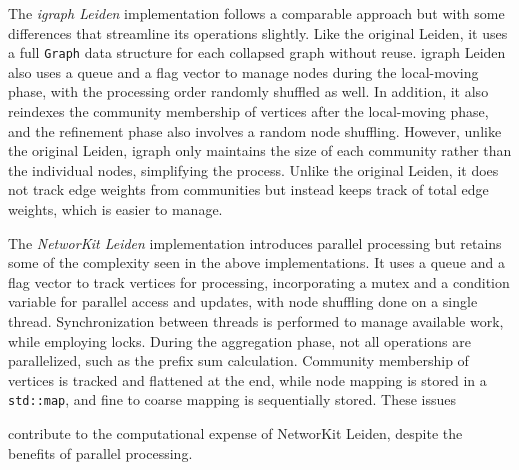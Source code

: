 The \textit{igraph Leiden} implementation \cite{csardi2006igraph} follows a comparable approach but with some differences that streamline its operations slightly. Like the original Leiden, it uses a full \texttt{Graph} data structure for each collapsed graph without reuse. igraph Leiden also uses a queue and a flag vector to manage nodes during the local-moving phase, with the processing order randomly shuffled as well. In addition, it also reindexes the community membership of vertices after the local-moving phase, and the refinement phase also involves a random node shuffling. However, unlike the original Leiden, igraph only maintains the size of each community rather than the individual nodes, simplifying the process. Unlike the original Leiden, it does not track edge weights from communities but instead keeps track of total edge weights, which is easier to manage.

The \textit{NetworKit Leiden} implementation \cite{staudt2016networkit} introduces parallel processing but retains some of the complexity seen in the above implementations. It uses a queue and a flag vector to track vertices for processing, incorporating a mutex and a condition variable for parallel access and updates, with node shuffling done on a single thread. Synchronization between threads is performed to manage available work, while employing locks. During the aggregation phase, not all operations are parallelized, such as the prefix sum calculation. Community membership of vertices is tracked and flattened at the end, while node mapping is stored in a \texttt{std::map}, and fine to coarse mapping is sequentially stored. These issues contribute to the computational expense of NetworKit Leiden, despite the benefits of parallel processing.
